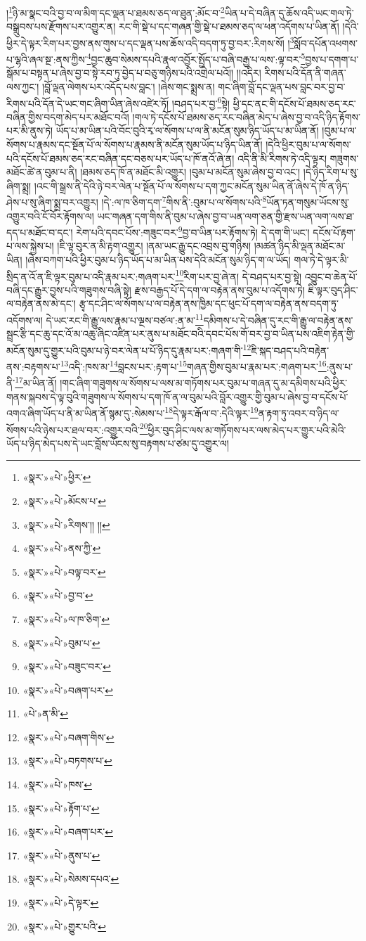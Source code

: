 །\footnote{«སྣར་»«པེ་»ཕྱིར་}ཉི་མ་སྣང་བའི་བྱ་བ་ལ་མིག་དང་ལྡན་པ་ཐམས་ཅད་ལ་ཐུན་:མོང་བ་\footnote{«སྣར་»«པེ་»མོངས་པ་}ཡིན་པ་དེ་བཞིན་དུ་ཆོས་འདི་ཡང་གལ་ཏེ་བསྒྲུབས་པས་རྫོགས་པར་འགྱུར་ན། རང་གི་སྡེ་པ་དང་གཞན་གྱི་སྡེ་པ་ཐམས་ཅད་ལ་ཕན་འདོགས་པ་ཡིན་ནོ། །དེའི་ཕྱིར་དེ་ལྟར་རིག་པར་བྱས་ནས་གུས་པ་དང་ལྡན་པས་ཆོས་འདི་བདག་ཏུ་བྱ་བར་:རིགས་སོ། །\footnote{«སྣར་»«པེ་»རིགས་།། །།}སློབ་དཔོན་འཕགས་པ་ལྷའི་ཞལ་སྔ་:ནས་ཀྱིས་\footnote{«སྣར་»«པེ་»ནས་ཀྱི་}བྱང་ཆུབ་སེམས་དཔའི་རྣལ་འབྱོར་སྤྱོད་པ་བཞི་བརྒྱ་པ་ལས་:ལྟ་བར་\footnote{«སྣར་»«པེ་»བལྟ་བར་}བྱས་པ་དགག་པ་སྒོམ་པ་བསྟན་པ་ཞེས་བྱ་བ་སྟེ་རབ་ཏུ་བྱེད་པ་བཅུ་གཉིས་པའི་འགྲེལ་པའོ།། །།འདིར། རིགས་པའི་དོན་ནི་གཞན་ལས་ཀྱང་། །བློ་ལྡན་ལེགས་པར་འདོད་པས་བླང་། །ཞེས་གང་སྨྲས་ན། གང་ཞིག་བློ་དང་ལྡན་པས་བླང་བར་བྱ་བ་རིགས་པའི་དོན་དེ་ཡང་གང་ཞིག་ཡིན་ཞེས་འཛེར་ཏོ། །བཤད་པར་བྱ་\footnote{«སྣར་»«པེ་»བྱ་བ་}སྟེ། ཕྱི་དང་ནང་གི་དངོས་པོ་ཐམས་ཅད་རང་བཞིན་གྱིས་བདག་མེད་པར་མཐོང་བའོ། །གལ་ཏེ་དངོས་པོ་ཐམས་ཅད་རང་བཞིན་མེད་པ་ཞེས་བྱ་བ་འདི་ཉིད་རྟོགས་པར་མི་ནུས་ཏེ། ཡོད་པ་མ་ཡིན་པའི་བོང་བུའི་རྭ་ལ་སོགས་པ་ལ་ནི་མངོན་སུམ་ཉིད་ཡོད་པ་མ་ཡིན་ནོ། །བུམ་པ་ལ་སོགས་པ་རྣམས་དང་སྔོན་པོ་ལ་སོགས་པ་རྣམས་ནི་མངོན་སུམ་ཡོད་པ་ཉིད་ཡིན་ནོ། །དེའི་ཕྱིར་བུམ་པ་ལ་སོགས་པའི་དངོས་པོ་ཐམས་ཅད་རང་བཞིན་དང་བཅས་པར་ཡོད་པ་ཁོ་ནའོ་ཞེ་ན། འདི་ནི་མི་རིགས་ཏེ་འདི་ལྟར། གཟུགས་མཐོང་ཚེ་ན་བུམ་པ་ནི། །ཐམས་ཅད་ཁོ་ན་མཐོང་མི་འགྱུར། །བུམ་པ་མངོན་སུམ་ཞེས་བྱ་བ་འང་། །དེ་ཉིད་རིག་པ་སུ་ཞིག་སྨྲ། །འང་གི་སྒྲས་ནི་དེའི་ཉེ་བར་ལེན་པ་སྔོན་པོ་ལ་སོགས་པ་དག་ཀྱང་མངོན་སུམ་ཡིན་ནོ་ཞེས་དེ་ཁོ་ན་ཉིད་ཤེས་པ་སུ་ཞིག་སྨྲ་བར་འགྱུར། །དེ་:ལ་ཁ་ཅིག་དག་\footnote{«སྣར་»«པེ་»ལ་ཁ་ཅིག་}གིས་ནི་:བུམ་པ་ལ་སོགས་པའི་\footnote{«སྣར་»«པེ་»བུམ་པ་}ཡོན་ཏན་གསུམ་ཡོངས་སུ་འགྱུར་བའི་ངོ་བོར་རྟོགས་ལ། ཡང་གཞན་དག་གིས་ནི་བུམ་པ་ཞེས་བྱ་བ་ཡན་ལག་ཅན་གྱི་རྫས་ཡན་ལག་ལས་ཐ་དད་པ་མཐོང་བ་དང་། རེག་པའི་དབང་པོས་:གཟུང་བར་\footnote{«སྣར་»«པེ་»བཟུང་བར་}བྱ་བ་ཡིན་པར་རྟོགས་ཏེ། དེ་དག་གི་ཡང་། དངོས་པོ་རྟག་པ་ལས་སྐྱེས་པ། །ཇི་ལྟ་བུར་ན་མི་རྟག་འགྱུར། །ནམ་ཡང་རྒྱུ་དང་འབྲས་བུ་གཉིས། །མཚན་ཉིད་མི་ལྡན་མཐོང་མ་ཡིན། །ཞེས་བཀག་པའི་ཕྱིར་བུམ་པ་ཉིད་ཡོད་པ་མ་ཡིན་པས་དེའི་མངོན་སུམ་ཉིད་ག་ལ་ཡོད། གལ་ཏེ་དེ་ལྟར་མི་སྲིད་ན་འོ་ན་ཇི་ལྟར་བུམ་པ་འདི་རྣམ་པར་:གཞག་པར་\footnote{«སྣར་»«པེ་»བཞག་པར་}རིག་པར་བྱ་ཞེ་ན། དེ་བཤད་པར་བྱ་སྟེ། འབྱུང་བ་ཆེན་པོ་བཞི་དང་རྒྱུར་བྱས་པའི་གཟུགས་བཞི་སྟེ། རྫས་བརྒྱད་པོ་དེ་དག་ལ་བརྟེན་ནས་བུམ་པ་འདོགས་ཏེ། ཇི་ལྟར་བུད་ཤིང་ལ་བརྟེན་ནས་མེ་དང་། རྩྭ་དང་ཤིང་ལ་སོགས་པ་ལ་བརྟེན་ནས་ཁྱིམ་དང་ཕུང་པོ་དག་ལ་བརྟེན་ནས་བདག་ཏུ་འདོགས་ལ། དེ་ཡང་རང་གི་རྒྱུ་ལས་རྣམ་པ་ལྔས་བཙལ་:ན་མ་\footnote{«པེ་»ན་མི་}དམིགས་པ་དེ་བཞིན་དུ་རང་གི་རྒྱུ་ལ་བརྟེན་ནས་སྦྲང་རྩི་དང་ཆུ་དང་འོ་མ་འཆུ་ཞིང་འཛིན་པར་ནུས་པ་མཐོང་བའི་དབང་པོས་གོ་བར་བྱ་བ་ཡིན་པས་འཇིག་རྟེན་གྱི་མངོན་སུམ་དུ་གྱུར་པའི་བུམ་པ་ཉེ་བར་ལེན་པ་པོ་ཉིད་དུ་རྣམ་པར་:གཞག་གི་\footnote{«སྣར་»«པེ་»བཞག་གིས་}ཇི་སྐད་བཤད་པའི་བརྟེན་ནས་:བརྟགས་པ་\footnote{«སྣར་»«པེ་»བཏགས་པ་}འདི་:ཁས་མ་\footnote{«སྣར་»«པེ་»ཁས་}བླངས་པར་:རྟག་པ་\footnote{«སྣར་»«པེ་»རྟོག་པ་}གཞན་གྱིས་བུམ་པ་རྣམ་པར་:གཞག་པར་\footnote{«སྣར་»«པེ་»བཞག་པར་}:ནུས་པ་ནི་\footnote{«སྣར་»«པེ་»ནུས་པ་}མ་ཡིན་ནོ། །གང་ཞིག་གཟུགས་ལ་སོགས་པ་ལས་མ་གཏོགས་པར་བུམ་པ་གཞན་དུ་མ་དམིགས་པའི་ཕྱིར་གནས་སྐབས་དེ་ལྟ་བུའི་གཟུགས་ལ་སོགས་པ་དག་ཁོ་ན་ལ་བུམ་པའི་བློར་འགྱུར་གྱི་བུམ་པ་ཞེས་བྱ་བ་དངོས་པོ་འགའ་ཞིག་ཡོད་པ་ནི་མ་ཡིན་ནོ་སྙམ་དུ་:སེམས་པ་\footnote{«སྣར་»«པེ་»སེམས་དཔའ་}དེ་ལྟར་རྒོལ་བ་:དེའི་ལྟར་\footnote{«སྣར་»«པེ་»དེ་ལྟར་}ན་རྟག་ཏུ་འབར་བ་ཉིད་ལ་སོགས་པའི་ཉེས་པར་ཐལ་བར་:འགྱུར་བའི་\footnote{«སྣར་»«པེ་»གྱུར་པའི་}ཕྱིར་བུད་ཤིང་ལས་མ་གཏོགས་པར་ལས་མེད་པར་གྱུར་པའི་མེའི་ཡོད་པ་ཉིད་མེད་པས་དེ་ཡང་བློས་ཡོངས་སུ་བརྟགས་པ་ཙམ་དུ་འགྱུར་ལ། 